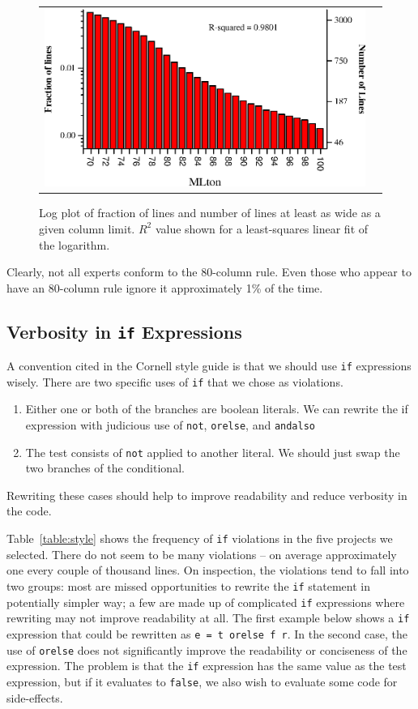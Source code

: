\documentclass[12pt,abstracton]{scrartcl}
\begin{document}
\begin{figure}[h!]
\begin{tabular}{cc}
\includegraphics[scale=0.68]{log-mlton.eps} &
\end{tabular}
\caption{Log plot of fraction of lines and number of lines at least as wide as a given column limit. $R^{2}$ value shown for a least-squares linear fit of the logarithm.}
\label{fig:log-width}
\end{figure}

Clearly, not all experts conform to the 80-column rule.
Even those who appear to have an 80-column rule ignore it approximately 1\% of the time.
\subsection{Verbosity in \texttt{if} Expressions}
A convention cited in the Cornell style guide is that we should use \texttt{if}
expressions wisely. There are two specific uses of \texttt{if} that we
chose as violations.
\begin{enumerate}
\item Either one or both of the branches are boolean literals. We can rewrite the if expression with judicious use of \texttt{not}, \texttt{orelse}, and \texttt{andalso}
\item The test consists of \texttt{not} applied to another literal. We should just swap the two branches of the conditional.
\end{enumerate}
Rewriting these cases should help to improve readability and reduce verbosity in the code.

Table~\ref{table:style} shows the frequency of \texttt{if} violations in the five projects we selected.
There do not seem to be many violations -- on average approximately one every couple of thousand lines.
On inspection, the violations tend to fall into two groups: most are
missed opportunities to rewrite the \texttt{if} statement in potentially simpler way;
a few are made up of complicated \texttt{if} expressions where rewriting may not improve readability at all.
The first example below shows a \texttt{if} expression that could be rewritten as \texttt{e = t orelse f r}.
In the second case, the use of \texttt{orelse} does not significantly improve the readability or conciseness
of the expression. The problem is that the \texttt{if} expression has the same value as the test expression,
but if it evaluates to \texttt{false}, we also wish to evaluate some code for side-effects.
\end{document}
